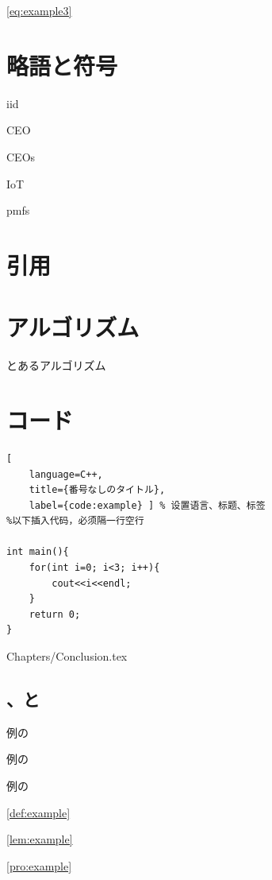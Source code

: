 \eqref{eq:example3}


\section{略語と符号}
\gls{iid}


\Gls{CEO}


\glspl{CEO}

\gls{IoT}


\Glspl{pmf}

\section{引用}
\cite{berger1978multiterminal}

\cite{berrou1996near,shannon1959coding,el2011network,mp3standard}

\cite{el2011network,berger1978multiterminal}

\cite{Tung1978multiterminal}

\section{アルゴリズム}
\begin{algorithm}
\caption{とあるアルゴリズム}
\label{alg:example}
\begin{algorithmic}

	\ENDFOR
\ELSE
	\ENDFOR 
\ENDIF
\end{algorithmic}
\end{algorithm}


\section{コード}
\begin{lstlisting}[
	language=C++,
	title={番号なしのタイトル},
	label={code:example} ] % 设置语言、标题、标签
%以下插入代码，必须隔一行空行

int main(){
	for(int i=0; i<3; i++){
		cout<<i<<endl;
	}
	return 0;
}
\end{lstlisting}


	{Chapters/Conclusion.tex} %


\subsection{\DefinitionName、\LemmaName と\PropositionName}

\Definition\label{def:example} 例の\DefinitionName

\Lemma\label{lem:example} 例の\LemmaName

\Proposition\label{pro:example} 例の\PropositionName

\ref{def:example}

\ref{lem:example}

\ref{pro:example}
